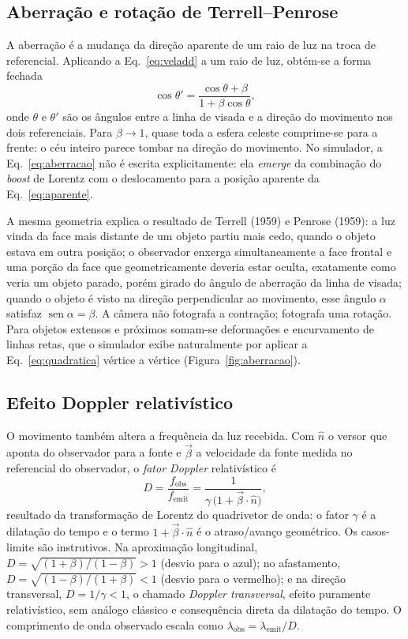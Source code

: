 \documentclass[10pt,a4paper,twocolumn]{article}
\begin{document}
\subsection{Aberração e rotação de Terrell--Penrose}

A aberração é a mudança da direção aparente de um raio de luz na troca de referencial.
Aplicando a Eq.~\eqref{eq:veladd} a um raio de luz, obtém-se a forma fechada
\begin{equation}
  \cos\theta' = \frac{\cos\theta + \beta}{1 + \beta\cos\theta},
  \label{eq:aberracao}
\end{equation}
onde $\theta$ e $\theta'$ são os ângulos entre a linha de visada e a direção do movimento
nos dois referenciais. Para $\beta \to 1$, quase toda a esfera celeste comprime-se para a
frente: o céu inteiro parece tombar na direção do movimento. No simulador, a
Eq.~\eqref{eq:aberracao} não é escrita explicitamente: ela \emph{emerge} da combinação do
\emph{boost} de Lorentz com o deslocamento para a posição aparente da
Eq.~\eqref{eq:aparente}.

A mesma geometria explica o resultado de Terrell (1959) e Penrose (1959): a luz vinda da
face mais distante de um objeto partiu mais cedo, quando o objeto estava em outra posição;
o observador enxerga simultaneamente a face frontal e uma porção da face que
geometricamente deveria estar oculta, exatamente como veria um objeto parado, porém
girado do ângulo de aberração da linha de visada; quando o objeto é visto na direção
perpendicular ao movimento, esse ângulo $\alpha$ satisfaz
$\operatorname{sen}\alpha = \beta$. A câmera não fotografa a contração;
fotografa uma rotação. Para objetos extensos e próximos somam-se deformações e encurvamento
de linhas retas, que o simulador exibe naturalmente por aplicar a
Eq.~\eqref{eq:quadratica} vértice a vértice (Figura~\ref{fig:aberracao}).

\subsection{Efeito Doppler relativístico}

O movimento também altera a frequência da luz recebida. Com $\hat{n}$ o versor que aponta
do observador para a fonte e $\vec{\beta}$ a velocidade da fonte medida no referencial do
observador, o \emph{fator Doppler} relativístico é
\begin{equation}
  D = \frac{f_{\mathrm{obs}}}{f_{\mathrm{emit}}}
    = \frac{1}{\gamma\,\bigl(1 + \vec{\beta}\cdot\hat{n}\bigr)} ,
  \label{eq:doppler}
\end{equation}
resultado da transformação de Lorentz do quadrivetor de onda: o fator $\gamma$ é a
dilatação do tempo e o termo $1 + \vec{\beta}\cdot\hat{n}$ é o atraso/avanço geométrico.
Os casos-limite são instrutivos. Na aproximação longitudinal,
$D = \sqrt{(1+\beta)/(1-\beta)} > 1$ (desvio para o azul); no afastamento,
$D = \sqrt{(1-\beta)/(1+\beta)} < 1$ (desvio para o vermelho); e na direção transversal,
$D = 1/\gamma < 1$, o chamado \emph{Doppler transversal}, efeito puramente relativístico,
sem análogo clássico e consequência direta da dilatação do tempo. O comprimento de onda
observado escala como $\lambda_{\mathrm{obs}} = \lambda_{\mathrm{emit}}/D$.
\end{document}

